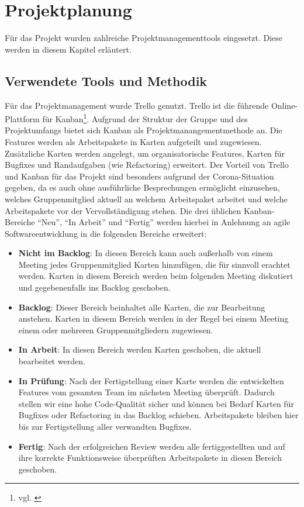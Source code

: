 \section{Projektplanung}
Für das Projekt wurden zahlreiche Projektmanagementtools eingesetzt.
Diese werden in diesem Kapitel erläutert.

\subsection{Verwendete Tools und Methodik}
Für das Projektmanagement wurde Trello genutzt.
Trello ist die führende Online-Plattform für Kanban\footnote{vgl. \cite{atlassian}}.
Aufgrund der Struktur der Gruppe und des Projektumfangs bietet sich Kanban als Projektmanangementmethode an.
Die Features werden als Arbeitspakete in Karten aufgeteilt und zugewiesen.
Zusätzliche Karten werden angelegt, um organisatorische Features, Karten für Bugfixes und Randaufgaben (wie Refactoring) erweitert.
Der Vorteil von Trello und Kanban für das Projekt sind besonders aufgrund der Corona-Situation gegeben, da es auch ohne ausführliche Besprechungen ermöglicht einzusehen, welches Gruppenmitglied aktuell an welchem Arbeitspaket arbeitet und welche Arbeitspakete vor der Vervollständigung stehen.
Die drei üblichen Kanban-Bereiche \enquote{Neu}, \enquote{In Arbeit} und \enquote{Fertig} werden hierbei in Anlehnung an agile Softwareentwicklung in die folgenden Bereiche erweitert:
\begin{itemize}
    \item \textbf{Nicht im Backlog}: In diesen Bereich kann auch außerhalb von einem Meeting jedes Gruppenmitglied Karten hinzufügen, die für sinnvoll erachtet werden. Karten in diesem Bereich werden beim folgenden Meeting diskutiert und gegebenenfalls ins Backlog geschoben.
    \item \textbf{Backlog}: Dieser Bereich beinhaltet alle Karten, die zur Bearbeitung anstehen. Karten in diesem Bereich werden in der Regel bei einem Meeting einem oder mehreren Gruppenmitgliedern zugewiesen.
    \item \textbf{In Arbeit}: In diesen Bereich werden Karten geschoben, die aktuell bearbeitet werden.
    \item \textbf{In Prüfung}: Nach der Fertigstellung einer Karte werden die entwickelten Features vom gesamten Team im nächsten Meeting überprüft. Dadurch stellen wir eine hohe Code-Qualität sicher und können bei Bedarf Karten für Bugfixes oder Refactoring in das Backlog schieben. Arbeitspakete bleiben hier bis zur Fertigstellung aller verwandten Bugfixes.
    \item \textbf{Fertig}: Nach der erfolgreichen Review werden alle fertiggestellten und auf ihre korrekte Funktionsweise überprüften Arbeitspakete in diesen Bereich geschoben.
\end{itemize}

